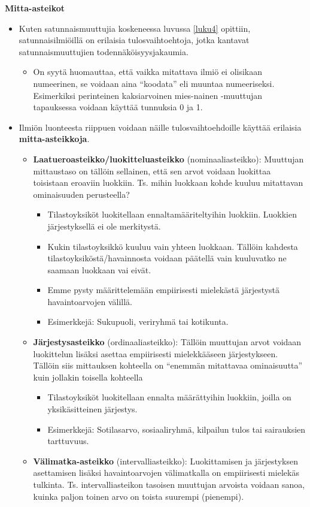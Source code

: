 \documentclass[
]{book}
\providecommand{\tightlist}{%
  \setlength{\itemsep}{0pt}\setlength{\parskip}{0pt}}
\begin{document}
\hfill\break

\textbf{Mitta-asteikot}

\begin{itemize}
\item
  Kuten satunnaismuuttujia koskeneessa luvussa \ref{luku4} opittiin, satunnaisilmiöillä on erilaisia tulosvaihtoehtoja, jotka kantavat satunnaismuuttujien todennäköisyysjakaumia.

  \begin{itemize}
  \tightlist
  \item
    On syytä huomauttaa, että vaikka mitattava ilmiö ei olisikaan numeerinen, se voidaan aina ``koodata'' eli muuntaa numeeriseksi. Esimerkiksi perinteinen kaksiarvoinen mies-nainen -muuttujan tapauksessa voidaan käyttää tunnuksia 0 ja 1.
  \end{itemize}
\item
  Ilmiön luonteesta riippuen voidaan näille tulosvaihtoehdoille käyttää erilaisia \textbf{mitta-asteikkoja}.

  \begin{itemize}
  \tightlist
  \item
    \textbf{Laatueroasteikko/luokitteluasteikko} (nominaaliasteikko): Muuttujan mittaustaso on tällöin sellainen, että sen arvot voidaan luokittaa toisistaan eroaviin luokkiin. Ts. mihin luokkaan kohde kuuluu mitattavan ominaisuuden perusteella?

    \begin{itemize}
    \tightlist
    \item
      Tilastoyksiköt luokitellaan ennaltamääriteltyihin luokkiin. Luokkien järjestyksellä ei ole merkitystä.
    \item
      Kukin tilastoyksikkö kuuluu vain yhteen luokkaan. Tällöin kahdesta tilastoyksiköstä/havainnosta voidaan päätellä vain kuuluvatko ne saamaan luokkaan vai eivät.
    \item
      Emme pysty määrittelemään empiirisesti mielekästä järjestystä havaintoarvojen välillä.
    \item
      Esimerkkejä: Sukupuoli, veriryhmä tai kotikunta.
    \end{itemize}
  \item
    \textbf{Järjestysasteikko} (ordinaaliasteikko): Tällöin muuttujan arvot voidaan luokittelun lisäksi asettaa empiirisesti mielekkääseen järjestykseen. Tällöin siis mittauksen kohteella on ``enemmän mitattavaa ominaisuutta'' kuin jollakin toisella kohteella

    \begin{itemize}
    \tightlist
    \item
      Tilastoyksiköt luokitellaan ennalta määrättyihin luokkiin, joilla on yksikäsitteinen järjestys.
    \item
      Esimerkkejä: Sotilasarvo, sosiaaliryhmä, kilpailun tulos tai sairauksien tarttuvuus.
    \end{itemize}
  \item
    \textbf{Välimatka-asteikko} (intervalliasteikko): Luokittamisen ja järjestyksen asettamisen lisäksi havaintoarvojen välimatkalla on empiirisesti mielekäs tulkinta. Ts. intervalliasteikon tasoisen muuttujan arvoista voidaan sanoa, kuinka paljon toinen arvo on toista suurempi (pienempi).


\end{itemize}
\end{itemize}
\end{document}
